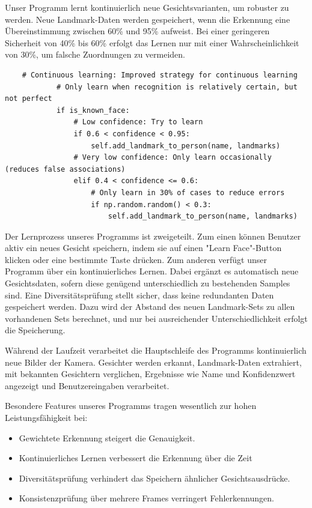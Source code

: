 Unser Programm lernt kontinuierlich neue Gesichtsvarianten, um robuster zu werden. Neue Landmark-Daten werden gespeichert, wenn die Erkennung eine Übereinstimmung zwischen 60\% und 95\% aufweist. 
Bei einer geringeren Sicherheit von 40\% bis 60\% erfolgt das Lernen nur mit einer Wahrscheinlichkeit von 30\%, um falsche Zuordnungen zu vermeiden.
\begin{lstlisting}
    # Continuous learning: Improved strategy for continuous learning
            # Only learn when recognition is relatively certain, but not perfect
            if is_known_face:
                # Low confidence: Try to learn
                if 0.6 < confidence < 0.95:
                    self.add_landmark_to_person(name, landmarks)
                # Very low confidence: Only learn occasionally (reduces false associations)
                elif 0.4 < confidence <= 0.6:
                    # Only learn in 30% of cases to reduce errors
                    if np.random.random() < 0.3:
                        self.add_landmark_to_person(name, landmarks)
\end{lstlisting}

Der Lernprozess unseres Programms ist zweigeteilt. Zum einen können Benutzer aktiv ein neues Gesicht speichern, indem sie auf einen "Learn Face"-Button klicken oder eine bestimmte Taste drücken.
Zum anderen verfügt unser Programm über ein kontinuierliches Lernen. Dabei ergänzt es automatisch neue Gesichtsdaten, sofern diese genügend unterschiedlich zu bestehenden Samples sind.
Eine Diversitätsprüfung stellt sicher, dass keine redundanten Daten gespeichert werden. Dazu wird der Abstand des neuen Landmark-Sets zu allen vorhandenen Sets berechnet, und nur bei ausreichender Unterschiedlichkeit erfolgt die Speicherung.

Während der Laufzeit verarbeitet die Hauptschleife des Programms kontinuierlich neue Bilder der Kamera. Gesichter werden erkannt, Landmark-Daten extrahiert, mit bekannten Gesichtern verglichen, Ergebnisse wie Name und Konfidenzwert angezeigt und Benutzereingaben verarbeitet.

Besondere Features unseres Programms tragen wesentlich zur hohen Leistungsfähigkeit bei:
\begin{itemize}
    \item Gewichtete Erkennung steigert die Genauigkeit.
    \item Kontinuierliches Lernen verbessert die Erkennung über die Zeit
    \item Diversitätsprüfung verhindert das Speichern ähnlicher Gesichtsausdrücke.
    \item Konsistenzprüfung über mehrere Frames verringert Fehlerkennungen.
\end{itemize}

